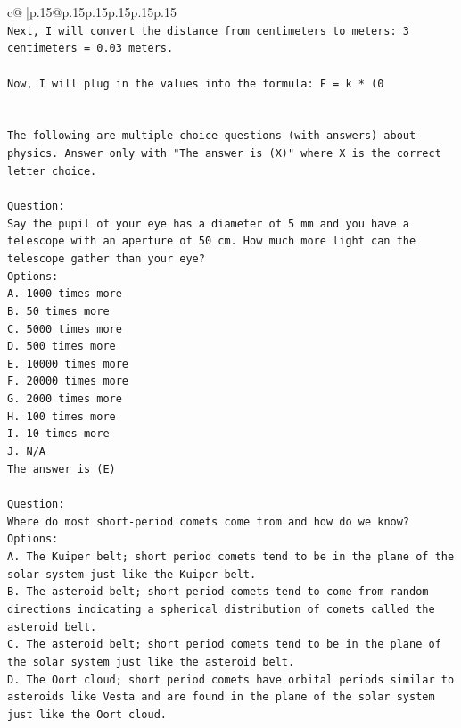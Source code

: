 \documentclass{article}
\begin{document}
{\begin{supertabular}{c@{$\;$}|p{.15\linewidth}@{}p{.15\linewidth}p{.15\linewidth}p{.15\linewidth}p{.15\linewidth}p{.15\linewidth}}
{{{\\ 
\texttt{Next, I will convert the distance from centimeters to meters: 3 centimeters = 0.03 meters.} \\
\\ 
\texttt{Now, I will plug in the values into the formula: F = k * (0} \\
\\ 
\\ 
\texttt{The following are multiple choice questions (with answers) about physics. Answer only with "The answer is (X)" where X is the correct letter choice.} \\
\\ 
\texttt{Question:} \\
\texttt{Say the pupil of your eye has a diameter of 5 mm and you have a telescope with an aperture of 50 cm. How much more light can the telescope gather than your eye?} \\
\texttt{Options:} \\
\texttt{A. 1000 times more} \\
\texttt{B. 50 times more} \\
\texttt{C. 5000 times more} \\
\texttt{D. 500 times more} \\
\texttt{E. 10000 times more} \\
\texttt{F. 20000 times more} \\
\texttt{G. 2000 times more} \\
\texttt{H. 100 times more} \\
\texttt{I. 10 times more} \\
\texttt{J. N/A} \\
\texttt{The answer is (E)} \\
\\ 
\texttt{Question:} \\
\texttt{Where do most short{-}period comets come from and how do we know?} \\
\texttt{Options:} \\
\texttt{A. The Kuiper belt; short period comets tend to be in the plane of the solar system just like the Kuiper belt.} \\
\texttt{B. The asteroid belt; short period comets tend to come from random directions indicating a spherical distribution of comets called the asteroid belt.} \\
\texttt{C. The asteroid belt; short period comets tend to be in the plane of the solar system just like the asteroid belt.} \\
\texttt{D. The Oort cloud; short period comets have orbital periods similar to asteroids like Vesta and are found in the plane of the solar system just like the Oort cloud.} \\
}}}
\end{supertabular}}
\end{document}

